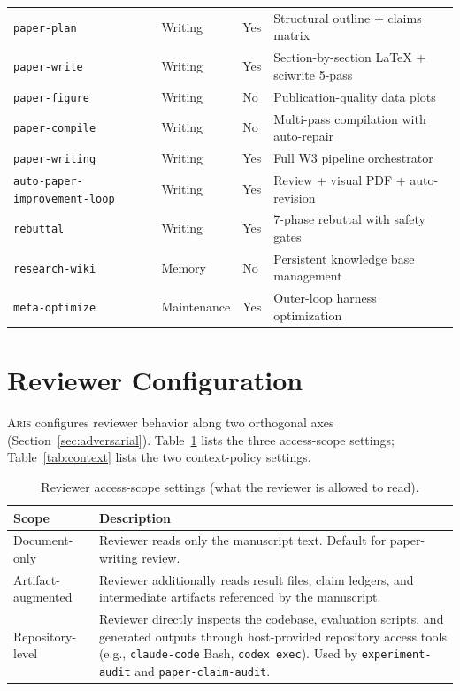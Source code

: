 \documentclass{article}
\newcommand{\aris}{\textsc{Aris}}
\theoremstyle{remark}
\begin{document}
\begin{table}[h]
{\begin{tabular}{@{}llll@{}}
\texttt{paper-plan} & Writing & Yes & Structural outline + claims matrix \\
\texttt{paper-write} & Writing & Yes & Section-by-section \LaTeX{} + sciwrite 5-pass \\
\texttt{paper-figure} & Writing & No & Publication-quality data plots \\
\texttt{paper-compile} & Writing & No & Multi-pass compilation with auto-repair \\
\texttt{paper-writing} & Writing & Yes & Full W3 pipeline orchestrator \\
\texttt{auto-paper-improvement-loop} & Writing & Yes & Review + visual PDF + auto-revision \\
\texttt{rebuttal} & Writing & Yes & 7-phase rebuttal with safety gates \\
\texttt{research-wiki} & Memory & No & Persistent knowledge base management \\
\texttt{meta-optimize} & Maintenance & Yes & Outer-loop harness optimization \\
\bottomrule
\end{tabular}}
\end{table}

\section{Reviewer Configuration}
\label{app:review}

\aris{} configures reviewer behavior along two orthogonal axes (Section~\ref{sec:adversarial}). Table~\ref{tab:scope} lists the three access-scope settings; Table~\ref{tab:context} lists the two context-policy settings.

\begin{table}[h]
\centering
\caption{Reviewer access-scope settings (what the reviewer is allowed to read).}
\label{tab:scope}
\small
\begin{tabular}{@{}lp{8cm}@{}}
\toprule
\textbf{Scope} & \textbf{Description} \\
\midrule
Document-only & Reviewer reads only the manuscript text. Default for paper-writing review. \\
Artifact-augmented & Reviewer additionally reads result files, claim ledgers, and intermediate artifacts referenced by the manuscript. \\
Repository-level & Reviewer directly inspects the codebase, evaluation scripts, and generated outputs through host-provided repository access tools (e.g., \texttt{claude-code} Bash, \texttt{codex exec}). Used by \texttt{experiment-audit} and \texttt{paper-claim-audit}. \\
\bottomrule
\end{tabular}
\end{table}
\end{document}
